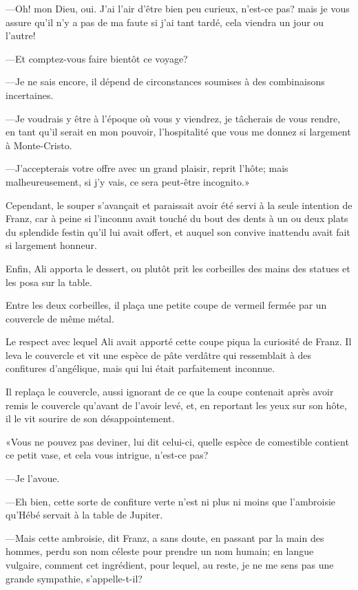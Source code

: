 —Oh! mon Dieu, oui. J'ai l'air d'être bien peu curieux, n'est-ce pas? mais je vous assure qu'il n'y a pas de ma faute si j'ai tant tardé, cela viendra un jour ou l'autre!

—Et comptez-vous faire bientôt ce voyage?

—Je ne sais encore, il dépend de circonstances soumises à des combinaisons incertaines.

—Je voudrais y être à l'époque où vous y viendrez, je tâcherais de vous rendre, en tant qu'il serait en mon pouvoir, l'hospitalité que vous me donnez si largement à Monte-Cristo.

—J'accepterais votre offre avec un grand plaisir, reprit l'hôte; mais malheureusement, si j'y vais, ce sera peut-être incognito.»

Cependant, le souper s'avançait et paraissait avoir été servi à la seule intention de Franz, car à peine si l'inconnu avait touché du bout des dents à un ou deux plats du splendide festin qu'il lui avait offert, et auquel son convive inattendu avait fait si largement honneur.

Enfin, Ali apporta le dessert, ou plutôt prit les corbeilles des mains des statues et les posa sur la table.

Entre les deux corbeilles, il plaça une petite coupe de vermeil fermée par un couvercle de même métal.

Le respect avec lequel Ali avait apporté cette coupe piqua la curiosité de Franz. Il leva le couvercle et vit une espèce de pâte verdâtre qui ressemblait à des confitures d'angélique, mais qui lui était parfaitement inconnue.

Il replaça le couvercle, aussi ignorant de ce que la coupe contenait après avoir remis le couvercle qu'avant de l'avoir levé, et, en reportant les yeux sur son hôte, il le vit sourire de son désappointement.

«Vous ne pouvez pas deviner, lui dit celui-ci, quelle espèce de comestible contient ce petit vase, et cela vous intrigue, n'est-ce pas?

—Je l'avoue.

—Eh bien, cette sorte de confiture verte n'est ni plus ni moins que l'ambroisie qu'Hébé servait à la table de Jupiter.

—Mais cette ambroisie, dit Franz, a sans doute, en passant par la main des hommes, perdu son nom céleste pour prendre un nom humain; en langue vulgaire, comment cet ingrédient, pour lequel, au reste, je ne me sens pas une grande sympathie, s'appelle-t-il?

